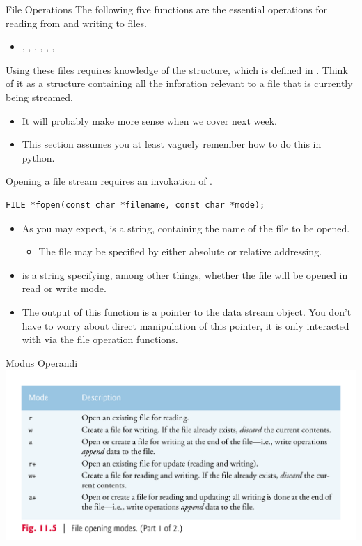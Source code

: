 \documentclass[11pt]{beamer}
\let\OldTexttt\texttt
\renewcommand{\texttt}[1]{\OldTexttt{\color{teal}{#1}}}
\begin{document}
\begin{frame}{File Operations}
The following five functions are the essential operations for reading from and writing to files.  
\begin{itemize}
\item \texttt{fopen()}, \texttt{fclose()}, \texttt{fscanf()}, \texttt{fread()}, \texttt{fwrite()}, \texttt{fprintf}, \texttt{feof()}
\end{itemize}
Using these files requires knowledge of the \texttt{FILE} structure, which is defined in \texttt{<stdio.h>}.  Think of it as a structure containing all the inforation relevant to a file that is currently being streamed. 
\begin{itemize}
\item It will probably make more sense when we cover \texttt{struct} next week.
\item This section assumes you at least vaguely remember how to do this in python.  
\end{itemize}
\end{frame}

\begin{frame}[fragile=singleslide]{\texttt{fopen()}}
Opening a file stream requires an invokation of \texttt{fopen()}.
\begin{lstlisting}[style=C]
FILE *fopen(const char *filename, const char *mode);
\end{lstlisting}
\begin{itemize}
\item As you may expect, \texttt{filename} is a string, containing the name of the file to be opened.
\begin{itemize}
\item The file may be specified by either absolute or relative addressing.  
\end{itemize}
\item \texttt{mode} is a string specifying, among other things, whether the file will be opened in read or write mode.  
\item The output of this function is a \texttt{FILE} pointer to the data stream object.  You don't have to worry about direct manipulation of this pointer, it is only interacted with via the file operation functions.  
\end{itemize}
\end{frame}

\begin{frame}{Modus Operandi}
\center
\includegraphics[scale=0.12]{modes.png}
\end{frame}
\end{document}
